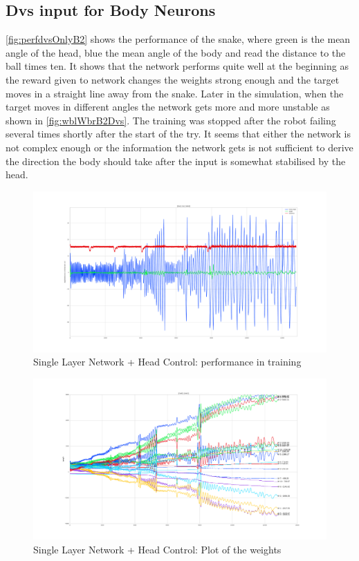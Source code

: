 \subsection{Dvs input for Body Neurons}
\autoref{fig:perfdvsOnlyB2} shows the performance of the snake, where green is the mean angle of the head, blue the mean angle of the body and read the distance to the ball times ten. It shows that the network performs quite well at the beginning as the reward given to network changes the weights strong enough and the target moves in a straight line away from the snake. Later in the simulation, when the target moves in different angles the network gets more and more unstable as shown in \autoref{fig:wblWbrB2Dvs}. The training was stopped after the robot failing several times shortly after the start of the try. It seems that either the network is not complex enough or the information the network gets is not sufficient to derive the direction the body should take after the input is somewhat stabilised by the head.
\begin{figure}[htpb]
  \centering
  \includegraphics[width=\textwidth]{figures/plots/perfdvsOnlyB2}
  \caption{ Single Layer Network + Head Control: performance in training }
  \label{fig:perfdvsOnlyB2}
\end{figure}
\begin{figure}[htpb]
  \centering
  \includegraphics[width=\textwidth]{figures/plots/wblWbrB2Dvs}
  \caption{ Single Layer Network + Head Control: Plot of the weights }
  \label{fig:wblWbrB2Dvs}
\end{figure}
